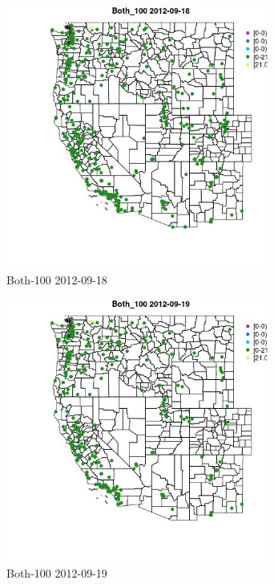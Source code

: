 \begin{figure} 
\centering  
\includegraphics[width=0.77\textwidth]{Code_Outputs/ML_input_report_ML_input_PM25_Step5_part_d_de_duplicated_aves_ML_input_MapObsBoth_1002012-09-18.jpg} 
\caption{\label{fig:ML_input_report_ML_input_PM25_Step5_part_d_de_duplicated_aves_ML_inputMapObsBoth_1002012-09-18}Both-100 2012-09-18} 
\end{figure} 
 

\clearpage 

\begin{figure} 
\centering  
\includegraphics[width=0.77\textwidth]{Code_Outputs/ML_input_report_ML_input_PM25_Step5_part_d_de_duplicated_aves_ML_input_MapObsBoth_1002012-09-19.jpg} 
\caption{\label{fig:ML_input_report_ML_input_PM25_Step5_part_d_de_duplicated_aves_ML_inputMapObsBoth_1002012-09-19}Both-100 2012-09-19} 
\end{figure} 
 

